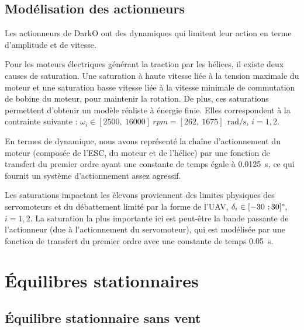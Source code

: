 \subsection{Modélisation des actionneurs}
    \label{sec:saturation}
    Les actionneurs de DarkO ont des dynamiques qui limitent leur action en terme d'amplitude et de vitesse.

    Pour les moteurs électriques générant la traction par les hélices, il existe deux causes de saturation. Une saturation à haute vitesse liée à  la tension maximale du moteur et une saturation basse vitesse liée à la vitesse minimale de commutation de bobine du moteur, pour maintenir la rotation. De plus, ces saturations permettent d'obtenir un modèle réaliste à énergie finie. Elles correspondent à la contrainte suivante : $\omega_i \in [2500,~16000]~rpm = [262,~1675]~\SI{}{\radian\per\second}$, $i=1,2$.
    
    En termes de dynamique, nous avons représenté la chaîne d'actionnement du moteur (composée de l'ESC, du moteur et de l'hélice) par une fonction de transfert du premier ordre ayant une constante de temps égale à \SI{0,0125}{\second}, ce qui fournit un système d'actionnement assez agressif.

    Les saturations impactant les élevons proviennent des limites physiques des servomoteurs et du débattement limité par la forme de l'UAV, $\delta_i \in [-30~; 30]\text{\textdegree}$, $i=1,2$. La saturation la plus importante ici est peut-être la bande passante de l'actionneur (due à l'actionnement du servomoteur), qui est modélisée par une fonction de transfert du premier ordre avec une constante de temps \SI{0,05}{\second}. 

\section{Équilibres stationnaires}
    \subsection{Équilibre stationnaire sans vent}
        \label{sec:eq_nowind}

